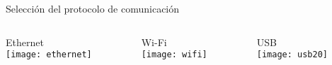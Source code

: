 %
\begin{frame}{Selección del protocolo de comunicación}
		\begin{columns}
			\begin{column}{.28\textwidth}
				\centering 
				Ethernet\\
				\vspace{1mm}
				\centering 
				\texttt{[image: ethernet]}
			\end{column}
			\begin{column}{.28\textwidth}
				\centering
				Wi-Fi\\
				\vspace{1mm}
				\centering 
				\texttt{[image: wifi]}
			\end{column}
			\begin{column}{.28\textwidth}
				\centering
				USB\\
				\vspace{1mm}
				\centering
				\texttt{[image: usb20]}
			\end{column}
		\end{columns}
	\vspace{2cm}
\end{frame}